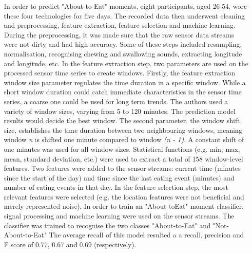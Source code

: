 
In order to predict "About-to-Eat" moments, eight participants, aged 26-54, wore these four technologies for five days. The recorded data then underwent cleaning and preprocessing, feature extraction, feature selection and machine learning. During the preprocessing, it was made sure that the raw sensor data streams were not dirty and had high accuracy. Some of these steps included resampling, normalisation, recognising chewing and swallowing sounds, extracting longitude and longitude, etc. 
In the feature extraction step, two parameters are used on the processed sensor time series to create windows. Firstly, the feature extraction window size parameter regulates the time duration in a specific window. While a short window duration could catch immediate characteristics in the sensor time series, a coarse one could be used for long term trends. The authors used a variety of window sizes, varying from 5 to 120 minutes. The prediction model results would decide the best window. The second parameter, the window shift size, establishes the time duration between two neighbouring windows, meaning window \textit{n} is shifted one minute compared to window \textit{(n - 1)}. A constant shift of one minutes was used for all window sizes. Statistical functions (e.g. min, max, mean, standard deviation, etc.) were used to extract a total of 158 window-level features. Two features were added to the sensor streams: current time (minutes since the start of the day) and time since the last eating event (minutes) and number of eating events in that day.
In the feature selection step, the most relevant features were selected (e.g. the location features were not beneficial and merely represented noise).
In order to train an "About-toEat" moment classifier, signal processing and machine learning were used on the sensor streams. The classifier was trained to recognise the two classes "About-to-Eat" and "Not-About-to-Eat"  The average recall of this model resulted a a recall, precision and F score of 0.77, 0.67 and 0.69 (respectively).

